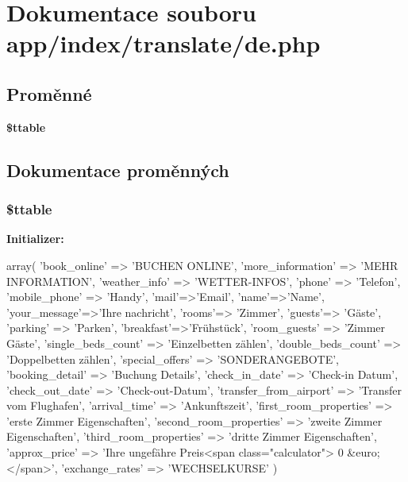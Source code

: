 \section{Dokumentace souboru app/index/translate/de.php}
\label{dd/daf/de_8php}
\subsection*{Proměnné}
\begin{DoxyCompactItemize}
\item 
{\bf \$ttable}
\end{DoxyCompactItemize}


\subsection{Dokumentace proměnných}
\subsubsection[{\$ttable}]{\setlength{\rightskip}{0pt plus 5cm}\$ttable}\label{dd/daf/de_8php_a35a6a273f392214c0227565567464b17}
{\bfseries Initializer:}
\begin{DoxyCode}
 array(
                'book_online' => 'BUCHEN ONLINE',
                'more_information' => 'MEHR INFORMATION',
                'weather_info' => 'WETTER-INFOS',
                'phone' => 'Telefon',
                'mobile_phone' => 'Handy',
                'mail'=>'Email',
                'name'=>'Name',
                'your_message'=>'Ihre nachricht',
                'rooms'=> 'Zimmer',
                'guests'=> 'Gäste',
                'parking' => 'Parken',
                'breakfast'=>'Frühstück',
                'room_guests' => 'Zimmer Gäste',
                'single_beds_count' => 'Einzelbetten zählen',
                'double_beds_count' => 'Doppelbetten zählen',
                'special_offers' => 'SONDERANGEBOTE',
                'booking_detail' => 'Buchung Details',
                'check_in_date' => 'Check-in Datum',
                'check_out_date' => 'Check-out-Datum',
                'transfer_from_airport' => 'Transfer vom Flughafen',
                'arrival_time' => 'Ankunftszeit',
                'first_room_properties' => 'erste Zimmer Eigenschaften',
                'second_room_properties' => 'zweite Zimmer Eigenschaften',
                'third_room_properties' => 'dritte Zimmer Eigenschaften',
                'approx_price' => 'Ihre ungefähre Preis<span class="calculator"> 
      0 &euro; </span>',
                'exchange_rates' => 'WECHSELKURSE'
        )
\end{DoxyCode}
